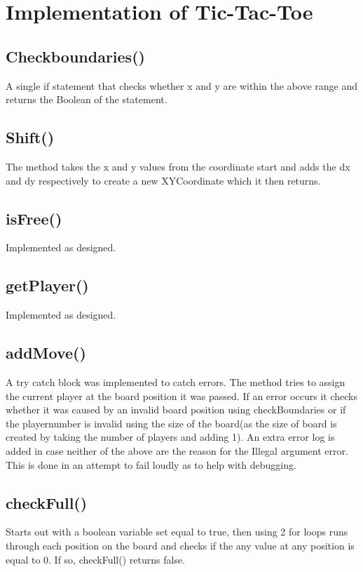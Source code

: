 \documentclass[a4paper,10pt]{article}
\begin{document}
		\section{Implementation  of Tic-Tac-Toe}  
	\subsection{Checkboundaries()}
	A single if statement that checks whether x and y are within the above range and returns the Boolean of the statement.
	\subsection{Shift()}
	The method takes the x and y values from the coordinate start and adds the dx and dy respectively to create a new XYCoordinate which it then returns.
	\subsection{isFree()}
	Implemented as designed.
	\subsection{getPlayer()}
	Implemented as designed.
	\subsection{addMove()}
	A try catch block was implemented to catch errors. The method tries to assign the current player at the board position it was passed. If an error occurs it checks whether it was caused by an invalid board position using checkBoundaries or if the playernumber is invalid using the size of the board(as the size of board is created by taking the number of players and adding 1). An extra error log is added in case neither of the above are the reason for the Illegal argument error. This is done in an attempt to fail loudly as to help with debugging.
	\subsection{checkFull()}
	Starts out with a boolean variable set equal to true, then using 2 for loops runs through each position on the board and checks if the any value at any position is equal to 0. If so, checkFull() returns false.
	
\end{document}
